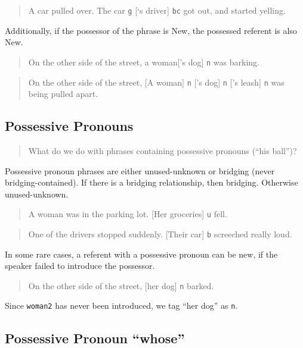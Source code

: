 \documentclass[
]{book}
\begin{document}
\begin{quote}
A car pulled over.
The car \texttt{g} {[}`s driver{]} \texttt{bc} got out, and started yelling.
\end{quote}

Additionally, if the possessor of the phrase is New,
the possessed referent is also New.

\begin{quote}
On the other side of the street, a woman{[}'s dog{]} \texttt{n} was barking.
\end{quote}

\begin{quote}
On the other side of the street,
{[}A woman{]} \texttt{n} {[}'s dog{]} \texttt{n} {[}'s leash{]} \texttt{n} was being pulled apart.
\end{quote}

\hypertarget{possessive-pronouns}{%
\subsection{Possessive Pronouns}\label{possessive-pronouns}}

\begin{quote}
What do we do with phrases containing possessive pronouns (``his ball'')?
\end{quote}

Possessive pronoun phrases are either unused-unknown or bridging (never bridging-contained).
If there is a bridging relationship, then bridging. Otherwise unused-unknown.

\begin{quote}
A woman was in the parking lot.
{[}Her groceries{]} \texttt{u} fell.
\end{quote}

\begin{quote}
One of the drivers stopped suddenly.
{[}Their car{]} \texttt{b} screeched really loud.
\end{quote}

In some rare cases, a referent with a possessive pronoun can be new,
if the speaker failed to introduce the possessor.

\begin{quote}
On the other side of the street, {[}her dog{]} \texttt{n} barked.
\end{quote}

Since \texttt{woman2} has never been introduced, we tag ``her dog'' as \texttt{n}.

\hypertarget{possessive-pronoun-whose}{%
\subsection{Possessive Pronoun ``whose''}\label{possessive-pronoun-whose}}
\end{document}
